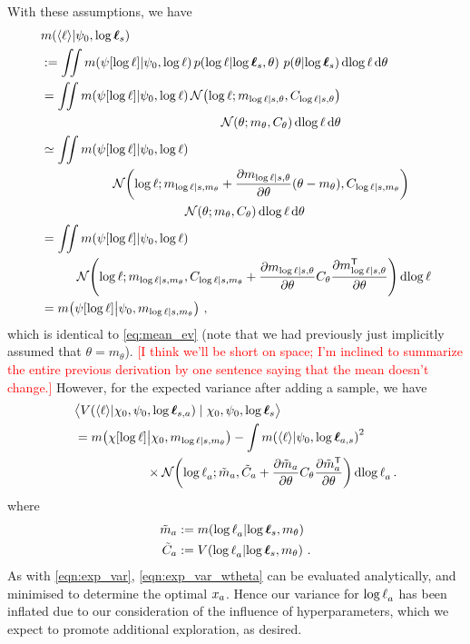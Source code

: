 \documentclass{article}
\begin{document}
With these assumptions, we have
\begin{align*}
& \mean{\inty{\lfn}}{\psi_0,\tvr_s} \\
& \deq \iint \mean{\psi[\tr]}{\psi_0,\tr}
\p{\tr}{\tvr_s, \theta}\, \p{\theta}{\tvr_s}\ud \tr\,\ud \theta\\
& = \iint \mean{\psi[\tr]}{\psi_0,\tr} \N{\tr}{m_{\tr|s,\theta}}{C_{\tr|s,\theta}}
\\
& \hspace{5cm}\N{\theta}{m_\theta}{C_\theta}\ud \tr\,\ud \theta
\\
& \simeq \iint \mean{\psi[\tr]}{\psi_0,\tr} 
\\
& \hspace{2cm}\N{\tr}
{m_{\tr|s,m_\theta}+\pderiv{m_{\tr|s,\theta}}{\theta}(\theta-m_\theta)}
{C_{\tr|s,m_\theta}}
\\
& \hspace{4cm}
\N{\theta}{m_\theta}{C_\theta}\ud \tr\,\ud \theta
\\
& = \iint \mean{\psi[\tr]}{\psi_0,\tr} \\
& \hspace{1cm}\N{\tr}
{m_{\tr|s,m_\theta}}
{C_{\tr|s,m_\theta}+\pderiv{m_{\tr|s,\theta}}{\theta}C_\theta\pderiv{m\tra_{\tr|s,\theta}}{\theta}}
\ud \tr
\\
& = \mean{\psi[\tr]}{\psi_0,m_{\tr|s,m_\theta}}\,,
\end{align*}
which is identical to \eqref{eq:mean_ev} (note that we had previously just implicitly assumed that $\theta=m_\theta$). 
\textcolor{red}{[I think we'll be short on space; I'm inclined to summarize the entire previous derivation by one sentence saying that the mean doesn't change.]}
However, for the expected variance after adding a sample, we have
\begin{align}\label{eqn:exp_var_wtheta}
& \bigl\langle \cov{\inty{\lfn}}{\chi_0,\psi_0,\tvr_{s,a}}\mid \chi_0,\psi_0,\tvr_{s}\bigr\rangle
\nonumber\\
& =  \mean{\chi[\tr]}{\chi_0,m_{\tr|s,m_\theta}}  - 
\int\mean{\inty{\lfn}}{\psi_0,\tvr_{a,s}}^2
\nonumber\\
& \hspace{2cm}
\times\N{\tr_a}
{\tilde{m}_a }
{\tilde{C}_a +\pderiv{\tilde{m}_a}{\theta}C_\theta\pderiv{\tilde{m}\tra_a}{\theta}}
\ud\tr_a\,.
\end{align}
where
\begin{align*}
\tilde{m}_a & \deq \mean{\tr_a}{\tvr_s,m_\theta}\\
\tilde{C}_a & \deq \cov{\tr_a}{\tvr_s,m_\theta}\,.
\end{align*}
As with \eqref{eqn:exp_var}, \eqref{eqn:exp_var_wtheta} can be evaluated analytically, and minimised to determine the optimal $\lfv_a$.
Hence our variance for $\tr_a$ has been inflated due to our consideration of the influence of hyperparameters, which we expect to promote additional exploration, as desired.
\end{document}
